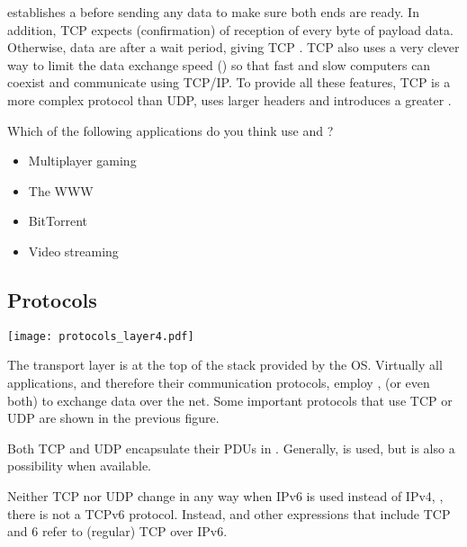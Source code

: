  establishes a  before sending any  data
to make sure both ends are ready. In addition, TCP expects  (confirmation)
of reception of every byte of payload data. Otherwise, data are  
after a wait period, giving TCP . TCP also uses a very clever way 
to limit the data exchange speed () so that fast and slow computers can coexist
and communicate using TCP/IP. To provide all these features, TCP is a more complex protocol than UDP,
uses larger headers and introduces a greater .

\begin{exercise}
Which of the following applications do you think use  and ?
\begin{itemize}
\item Multiplayer gaming
\item The WWW
\item BitTorrent
\item Video streaming
\end{itemize}
\end{exercise}

\subsection*{Protocols}

\begin{center}
\texttt{[image: protocols\_layer4.pdf]}
\end{center}

The transport layer is at the top of the stack provided by the OS. 
Virtually all applications, and therefore their communication protocols,
employ ,  (or even both) to exchange data over the net.
Some important protocols that use TCP or UDP are shown in the previous figure.

Both TCP and UDP encapsulate their PDUs in  . 
Generally,  is used, but  is also a possibility when available.

\begin{remark}
Neither TCP nor UDP change in any way when IPv6 is used instead of IPv4, \ie,
there is not a TCPv6 protocol. Instead,  and other expressions that include 
TCP and 6 refer to (regular) TCP over IPv6.
\end{remark}


